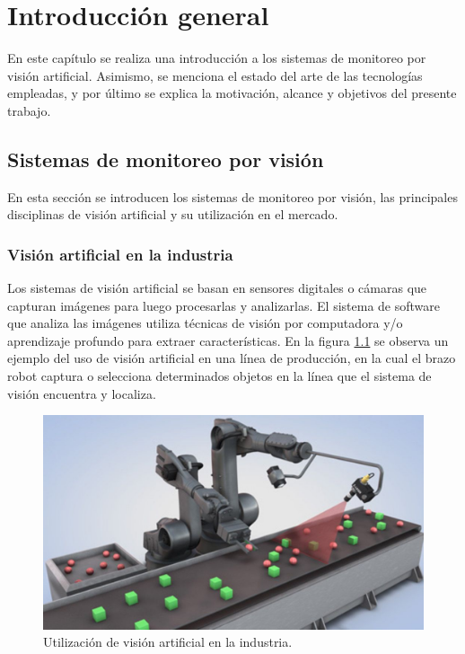 
\chapter{Introducción general} %

\label{Chapter1} %
\label{IntroGeneral}

En este capítulo se realiza una introducción a los sistemas de monitoreo por visión artificial. Asimismo, se menciona el estado del arte de las tecnologías empleadas, y por último se explica la motivación, alcance y objetivos del presente trabajo.


\section{Sistemas de monitoreo por visión}
\label{sec:sistemasVision}

En esta sección se introducen los sistemas de monitoreo por visión, las principales disciplinas de visión artificial y su utilización en el mercado.

\subsection{Visión artificial en la industria}

Los sistemas de visión artificial se basan en sensores digitales o cámaras que capturan imágenes para luego procesarlas y analizarlas. El sistema de software que analiza las imágenes utiliza técnicas de visión por computadora y/o aprendizaje profundo para extraer características. En la figura \ref{fig:visionArtificial} se observa un ejemplo del uso de visión artificial en una línea de producción, en la cual el brazo robot captura o selecciona determinados objetos en la línea que el sistema de visión encuentra y localiza.

\begin{figure}[ht]
	\centering
	\includegraphics[scale=.55]{./Figures/visionArtificial.jpg}
	\caption{Utilización de visión artificial en la industria\protect\footnotemark.}
	\label{fig:visionArtificial}
\end{figure}

